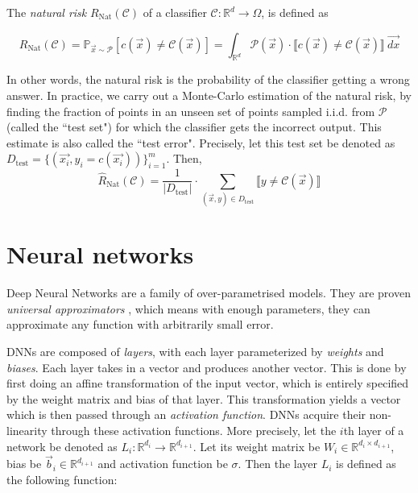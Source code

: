 \documentclass[12pt, oneside]{book}
\begin{document}
The \emph{natural risk} $R_{\text{Nat}}(\mathcal{C}) $ of a classifier
$\mathcal{C}: \mathbb{R}^d \to \Omega$, is defined as

\begin{equation}
    R_{\text{Nat}}(\mathcal{C}) = \mathbb{P}_{\vec{x} \sim \mathcal{P}}
    [c(\vec{x}) \neq \mathcal{C}(\vec{x})] = \int_{\mathbb{R}^d} \mathcal{P}(\vec{x})
    \cdot\llbracket c(\vec{x}) \neq \mathcal{C}(\vec{x}) \rrbracket~\vec{dx}
\end{equation}

In other words, the natural risk is the probability of the classifier getting a
wrong answer. In practice, we carry out a Monte-Carlo estimation of the natural
risk, by finding the fraction of points in an unseen set of points sampled
i.i.d. from $\mathcal{P}$ (called the ``test set") for which the classifier gets
the incorrect output. This estimate is also called the ``test error". Precisely,
let this test set be denoted as $D_\text{test} = \{ (\vec{x_i},
y_i=c(\vec{x_i})) \}_{i=1}^m$. Then,
\begin{equation*}
    \hat{R}_{\text{Nat}}(\mathcal{C})
    = \frac{1}{|D_\text{test}|} \cdot \sum_{(\vec{x}, y) \in D_\text{test}} 
    \llbracket y \neq \mathcal{C}(\vec{x}) \rrbracket
\end{equation*}

\section{Neural networks}

Deep Neural Networks are a family of over-parametrised models. They are proven
\emph{universal approximators} \citep{hornik1989multilayer}, which means with
enough parameters, they can approximate any function with arbitrarily small
error.

DNNs are composed of \emph{layers}, with each layer parameterized by
\emph{weights} and \emph{biases}. Each layer takes in a vector and produces
another vector. This is done by first doing an affine transformation of the
input vector, which is entirely specified by the weight matrix and bias of that
layer. This transformation yields a vector which is then passed through an
\emph{activation function}. DNNs acquire their non-linearity through these
activation functions. More precisely, let the $i$th layer of a network be
denoted as $L_i: \mathbb{R}^{d_{i}} \to \mathbb{R}^{d_{i+1}}$. Let its weight
matrix be $W_i \in \mathbb{R}^{d_i \times d_{i+1}}$, bias be $\vec{b}_i \in
\mathbb{R}^{d_{i+1}}$ and activation function be $\sigma$. Then the layer $L_i$
is defined as the following function:
\end{document}
